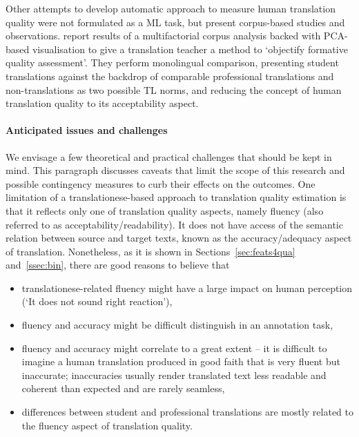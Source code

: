 Other attempts to develop automatic approach to measure human translation quality were not formulated as a ML task, but present corpus-based studies and observations. \citet{Sutter2017} report results of a multifactorial corpus analysis backed with \gls{PCA}-based visualisation to give a translation teacher a method to `objectify formative quality assessment'. They perform monolingual comparison, presenting student translations against the backdrop of comparable professional translations and non-translations as two possible TL norms, and reducing the concept of human translation quality to its acceptability aspect. 

\paragraph{Anticipated issues and challenges} We envisage a few theoretical and practical challenges that should be kept in mind. This paragraph discusses caveats that limit the scope of this research and possible contingency measures to curb their effects on the outcomes. 
One limitation of a translationese-based approach to translation quality estimation is that it reflects only one of translation quality aspects, namely fluency (also referred to as acceptability/readability). It does not have access of the semantic relation between source and target texts, known as the accuracy/adequacy aspect of translation. Nonetheless, as it is shown in Sections~\ref{sec:feats4qua} and~\ref{ssec:bin}, there are good reasons to believe that 
\begin{itemize}\compresslist{}
	\item translationese-related fluency might have a large impact on human perception (`It does not sound right reaction'),
	\item fluency and accuracy might be difficult distinguish in an annotation task, 
	\item fluency and accuracy might correlate to a great extent -- it is difficult to imagine a human translation produced in good faith that is very fluent but inaccurate; inaccuracies usually render translated text less readable and coherent than expected and are rarely seamless,
	\item differences between student and professional translations are mostly related to the fluency aspect of translation quality.
\end{itemize}

